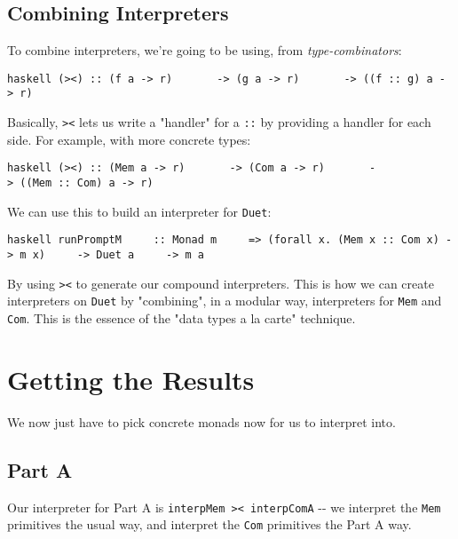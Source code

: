 \documentclass[]{article}
\begin{document}
\subsection{Combining Interpreters}

To combine interpreters, we're going to be using, from \emph{type-combinators}:

\texttt{haskell\ (\textgreater{}\textbar{}\textless{})\ ::\ (f\ a\ -\textgreater{}\ r)\ \ \ \ \ \ \ -\textgreater{}\ (g\ a\ -\textgreater{}\ r)\ \ \ \ \ \ \ -\textgreater{}\ ((f\ :\textbar{}:\ g)\ a\ -\textgreater{}\ r)}

Basically, \texttt{\textgreater{}\textbar{}\textless{}} lets us write a
"handler" for a \texttt{:\textbar{}:} by providing a handler for each side. For
example, with more concrete types:

\texttt{haskell\ (\textgreater{}\textbar{}\textless{})\ ::\ (Mem\ a\ -\textgreater{}\ r)\ \ \ \ \ \ \ -\textgreater{}\ (Com\ a\ -\textgreater{}\ r)\ \ \ \ \ \ \ -\textgreater{}\ ((Mem\ :\textbar{}:\ Com)\ a\ -\textgreater{}\ r)}

We can use this to build an interpreter for \texttt{Duet}:

\texttt{haskell\ runPromptM\ \ \ \ \ ::\ Monad\ m\ \ \ \ \ =\textgreater{}\ (forall\ x.\ (Mem\ x\ :\textbar{}:\ Com\ x)\ -\textgreater{}\ m\ x)\ \ \ \ \ -\textgreater{}\ Duet\ a\ \ \ \ \ -\textgreater{}\ m\ a}

By using \texttt{\textgreater{}\textbar{}\textless{}} to generate our compound
interpreters. This is how we can create interpreters on \texttt{Duet} by
"combining", in a modular way, interpreters for \texttt{Mem} and \texttt{Com}.
This is the essence of the "data types a la carte" technique.

\section{Getting the Results}

We now just have to pick concrete monads now for us to interpret into.

\subsection{Part A}

Our interpreter for Part A is
\texttt{interpMem\ \textgreater{}\textbar{}\textless{}\ interpComA} -\/- we
interpret the \texttt{Mem} primitives the usual way, and interpret the
\texttt{Com} primitives the Part A way.
\end{document}
